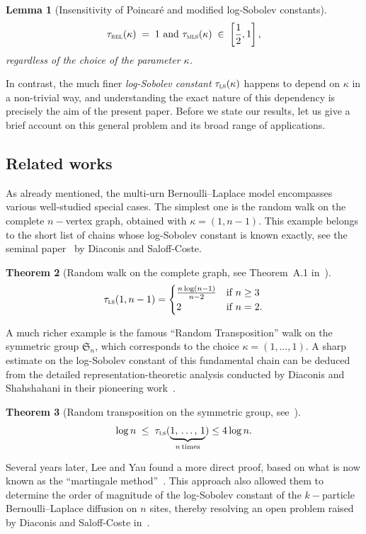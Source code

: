 \documentclass[10pt]{amsart}
\newtheorem{theo}{Theorem}[section]
\newtheorem{lemm}[theo]{Lemma}\newtheorem{prop}[theo]{Proposition}\newtheorem{coro}[theo]{Corollary}\newtheorem{conj}[theo]{Conjecture}
\theoremstyle{definition}\newtheorem{defi}[theo]{Definition}\newtheorem{rema}[theo]{Remark}\newtheorem{exam}[theo]{Example}\newtheorem{exem}[theo]{Example}\newtheorem{nota}[theo]{Notation}
\newcommand{\frkS}{\mathfrak{S}}
\newcommand{\trel}{\tau_{\textsc{rel}}}
\newcommand{\tmls}{\tau_{\textsc{mls}}}
\newcommand{\tls}{\tau_{\textsc{ls}}}
\begin{document}
\begin{lemm}[Insensitivity of Poincaré and modified log-Sobolev constants] \label{pr:insensitive}
\[
\trel(\kappa) \; = \; 1 \text{ and } \tmls(\kappa) \; \in \; \left[\frac{1}{2},1\right],
\]
regardless of the choice of the parameter $\kappa$.
\end{lemm}

In contrast, the much finer \emph{log-Sobolev constant} $\tls(\kappa)$ happens to depend on $\kappa$ in a non-trivial way, and understanding the exact nature of this dependency is precisely the aim of the present paper. Before we state our results, let us give a brief account on this general problem and its broad range of applications.



\subsection{Related works}

As already mentioned, the multi-urn Bernoulli--Laplace model encompasses various well-studied special cases. The simplest one is the random walk on the complete $n-$vertex graph, obtained with $\kappa=(1,n-1)$. This example belongs to the short list of chains whose log-Sobolev constant is known exactly, see the seminal paper~\cite{MR1410112} by Diaconis and Saloff-Coste.
\begin{theo}[Random walk on the complete graph, see Theorem~A.1 in~\cite{MR1410112}] \label{th:RW}
\[
\tls(1,n-1)  =  
\begin{cases}
\frac{n\log(n-1)}{n-2} & \text{if }n\ge 3\\
2 & \text{if }n=2.
\end{cases}
\]
\end{theo}


A much richer example is the famous ``Random Transposition'' walk on the symmetric group ${\frkS}_n$, which corresponds to the choice $\kappa=(1,\ldots,1)$. A sharp estimate on the log-Sobolev constant of this fundamental chain can be deduced from the detailed representation-theoretic analysis conducted by Diaconis and Shahshahani in their pioneering work~\cite{MR626813}.


\begin{theo}[Random transposition on the symmetric group, see~\cite{MR626813}]\label{th:RT}
\[
\log n\; \le \; \tls(\underbrace{1,\,\ldots,\,1}_{n\,\text{times}}) \le 4\log n.
\]
\end{theo}

Several years later, Lee and Yau found a more direct proof, based on what is now known as the ``martingale method''~\cite{MR1675008}. This approach also allowed them to determine the order of magnitude of the log-Sobolev constant of the $k-$particle Bernoulli--Laplace diffusion on $n$ sites, thereby resolving an open problem raised by Diaconis and Saloff-Coste in~\cite{MR1410112}.
\end{document}
